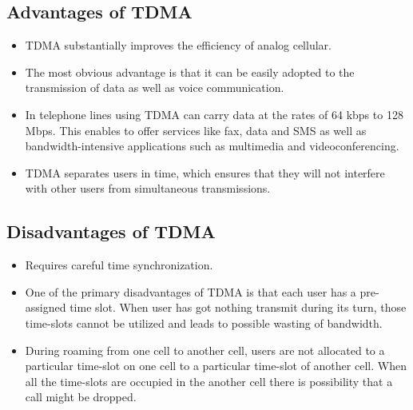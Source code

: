 \subsection{Advantages of TDMA}
\begin{itemize}
\item TDMA substantially improves the efficiency of analog cellular.
\item The most obvious advantage is that it can be easily adopted to the transmission of data as well as voice communication.
\item In telephone lines using TDMA can carry data at the rates of 64 kbps to 128 Mbps. This enables to offer services like fax, data and SMS as well as bandwidth-intensive applications such as multimedia and videoconferencing.
\item TDMA separates users in time, which ensures that they will not interfere with other users from simultaneous transmissions.
\end{itemize}
\subsection{Disadvantages of TDMA}
\begin{itemize}
\item Requires careful time synchronization.
\item One of the primary disadvantages of TDMA is that each user has a pre-assigned time slot. When user has got nothing transmit during its turn, those time-slots cannot be utilized and leads to possible wasting of bandwidth.
\item During roaming from one cell to another cell, users are not allocated to a particular time-slot on one cell to a particular time-slot of another cell. When all the time-slots are occupied in the another cell there is possibility that a call might be dropped.
\end{itemize}
